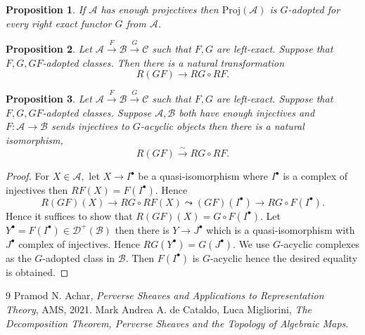 \documentclass[10pt]{article}
\numberwithin{equation}{section}
\newtheorem{proposition}{Proposition}[section]
\newcommand{\cD}[0]{\mathcal{D}}
\newcommand{\sC}[0]{\mathscr{C}}
\newcommand{\sA}[0]{\mathscr{A}}
\newcommand{\sB}[0]{\mathscr{B}}
\begin{document}
\begin{proposition}
    If $\sA$ has enough projectives then $\mathrm{Proj}(\sA)$ is $G$-adopted for every right exact functor $G$ from $\sA$.
\end{proposition}

\begin{proposition}
    Let $\sA\stackrel{F}{\to}\sB\stackrel{G}{\to}\sC$ such that $F,G$ are left-exact. Suppose that $F,G,GF$-adopted classes. Then there is a natural transformation
    \begin{equation*}
        R(GF)\stackrel{\:}{\to}RG\circ RF.
    \end{equation*}
\end{proposition}

\begin{proposition}
    Let $\sA\stackrel{F}{\to}\sB\stackrel{G}{\to}\sC$ such that $F,G$ are left-exact. Suppose that $F,G,GF$-adopted classes. 
    Suppose $\sA,\sB$ both have enough injectives and $F:\sA\to\sB$ sends injectives to $G$-acyclic objects then there is a natural isomorphism,
    \begin{equation*}
        R(GF)\stackrel{\sim}{\to}RG\circ RF.
    \end{equation*}
\end{proposition}
\begin{proof}
    For $X\in\sA,$ let $X\to I^\bullet$ be a quasi-isomorphism where $I^\bullet$ is a complex of injectives then $RF(X) = F(I^\bullet)$. Hence 
    \begin{equation*}
        R(GF)(X)\to RG\circ RF(X)\leadsto (GF)(I^\bullet) \to RG\circ F(I^\bullet).
    \end{equation*}
    Hence it suffices to show that $R(GF)(X)=G\circ F(I^\bullet)$. Let $Y^\bullet = F(I^\bullet)\in\cD^+(\sB)$ then there is $Y\to J^\bullet $ which is a quasi-isomorphism with $J^\bullet$ complex of injectives. Hence $RG(Y^\bullet) = G(J^\bullet)$. 
    We use $G$-acyclic complexes as the $G$-adopted class in $\sB$. Then $F(I^\bullet)$ is $G$-acyclic hence the desired equality is obtained.
\end{proof}

\begin{thebibliography}{9}
Pramod N. Achar, \emph{Perverse Sheaves and Applications to Representation Theory}, AMS, 2021.
Mark Andrea A. de Cataldo, Luca Migliorini, \emph{The Decomposition Theorem, Perverse Sheaves and the Topology of Algebraic Maps}.
\end{thebibliography}
\end{document}
